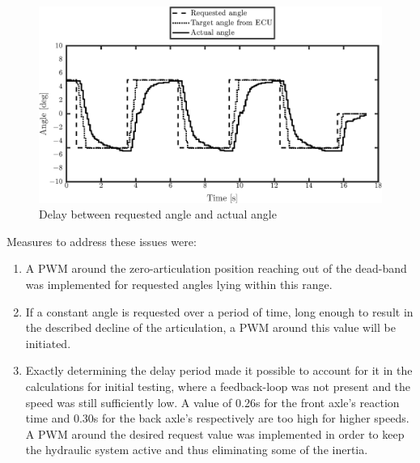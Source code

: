 \documentclass[root.tex]{subfiles}
\begin{document}
\begin{enumerate}
		\begin{figure}[!h]
			
			\includegraphics[width=1\linewidth]{Step_input_request}
			\caption[Delay between requested and actual angle]{Delay between requested angle and actual angle}
			
			\label{fig:Step_input_request}
		\end{figure}
		
	\end{enumerate}
	
	
	
	
	Measures to address these issues were:
	
	\begin{enumerate}
		\item A \gls{PWM} around the zero-articulation position reaching out of the dead-band was implemented for requested angles lying within this range. 
		
		\item If a constant angle is requested over a period of time, long enough to result in the described decline of the articulation, a \gls{PWM} around this value will be initiated. 
		
		\item Exactly determining the delay period made it possible to account for it in the calculations for initial testing, where a feedback-loop was not present and the speed was still sufficiently low. A value of 0.26s for the front axle's reaction time and 0.30s for the back axle's respectively are too high for higher speeds.\\
		A \gls{PWM} around the desired request value was implemented in order to keep the hydraulic system active and thus eliminating some of the inertia. 
	\end{enumerate}
	
	
	
	
	
	
\end{document}
